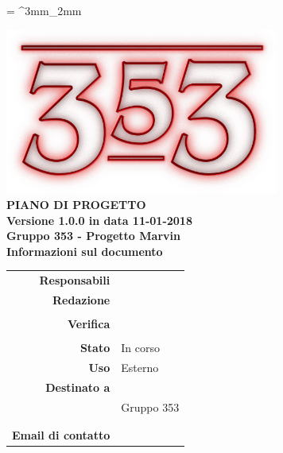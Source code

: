 \documentclass[openany, a4paper, 12pt]{report}
\begin{document}
\tabulinesep = ^3mm_2mm

\begin{titlepage}
	\centering
	\vfill
	{
		\bfseries
		\vskip2cm
		\includegraphics[width=9cm]{../../common/images/logo.png} \\
		\vfill
		\Huge{PIANO DI PROGETTO}\\
		\vfill
		\Large Versione 1.0.0 in data 11-01-2018\\
		\large Gruppo 353 - Progetto Marvin\\
		\vfill
		\normalsize Informazioni sul documento\\
		\begin{table}[htbp]
			\centering
			\renewcommand\arraystretch{1.2}
			\begin{tabular}{r|l}
				\hline
				\textbf{Responsabili}	& \Elena \\
				
				\textbf{Redazione} 		& \Riccardo \\
										& \Valentina \\
										
				\textbf{Verifica} 		& \Parwinder \\
										& \Davide \\	
				
				\textbf{Stato} 			& In corso\\
				\textbf{Uso}			& Esterno\\
				\textbf{Destinato a}   	& \Proponente\\
										& Gruppo 353\\
										& \Vardanega\\
										& \Cardin\\
				
				\textbf{Email di contatto}	& \mailgroup
			\end{tabular}
		\end{table}
		\vfill
	}    
\end{titlepage}

\tableofcontents
\listoffigures
\listoftables
\newpage
{}






 

\end{document}
